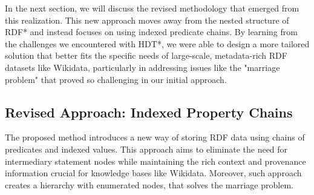 In the next section, we will discuss the revised methodology that emerged from this realization. This new approach moves away from the nested structure of RDF* and instead focuses on using indexed predicate chains. By learning from the challenges we encountered with HDT*, we were able to design a more tailored solution that better fits the specific needs of large-scale, metadata-rich RDF datasets like Wikidata, particularly in addressing issues like the "marriage problem" that proved so challenging in our initial approach.



\subsection{Revised Approach: Indexed Property Chains}


The proposed method introduces a new way of storing RDF data using chains of predicates and indexed values. This approach aims to eliminate the need for intermediary statement nodes while maintaining the rich context and provenance information crucial for knowledge bases like Wikidata. Moreover, such approach creates a hierarchy with enumerated nodes, that solves the marriage problem.

